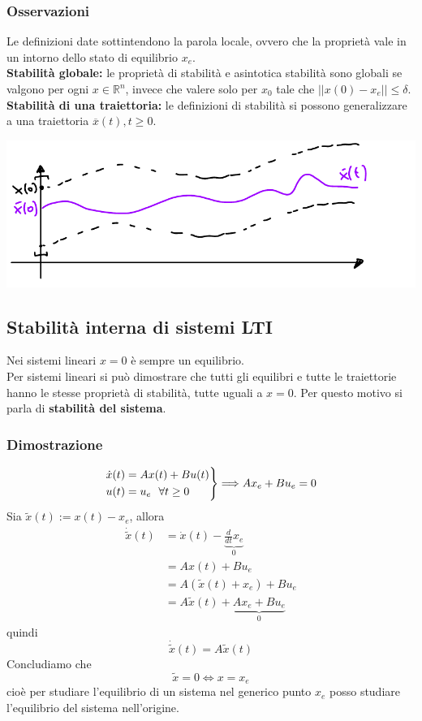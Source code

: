 \documentclass{article}
\begin{document}
\subsubsection{Osservazioni}
Le definizioni date sottintendono la parola locale, ovvero che la proprietà vale in un intorno dello stato di equilibrio $x_e$.
\vspace*{0.2cm}\\
\textbf{Stabilità globale:} le proprietà di stabilità e asintotica stabilità sono globali se valgono per ogni $x \in \mathbb{R}^n$, invece che valere solo per $x_0$ tale che $|| x(0)-x_e || \leq \delta $.
\vspace*{0.2cm}\\
\textbf{Stabilità di una traiettoria:} le definizioni di stabilità si possono generalizzare a una traiettoria $\overline{x}(t), t \geq 0$.
\begin{center}
    \includegraphics[scale=0.3]{Images/Stabilita_traiettoria.png}
\end{center}

\subsection{Stabilità interna di sistemi LTI}
Nei sistemi lineari $x=0$ è sempre un equilibrio.\\
Per sistemi lineari si può dimostrare che tutti gli equilibri e tutte le traiettorie hanno le stesse proprietà di stabilità, tutte uguali a $x=0$. Per questo motivo si parla di \textbf{stabilità del sistema}.
\subsubsection*{Dimostrazione}
\[
    \begin{rcases}
        \dot x(t) = Ax(t) + Bu(t)\\
        u(t) = u_e \ \ \forall t \geq 0
    \end{rcases}
    \Longrightarrow Ax_e + Bu_e = 0
\]
Sia $\tilde{x}(t) := x(t) - x_e$, allora
\begin{align*}
    \dot{\tilde{x}}(t) &= \dot x(t) - \underbrace{\frac{d}{dt}x_e}_{0}\\
    &=Ax(t)+Bu_e\\
    &=A(\tilde{x}(t)+x_e)+Bu_e\\
    &=A \tilde{x}(t) + \underbrace{Ax_e+Bu_e}_{0}
\end{align*}
quindi
\[
    \dot{\tilde{x}}(t) = A \tilde{x}(t)
\]
Concludiamo che
\[
    \tilde{x}=0 \Longleftrightarrow x = x_e
\]
cioè per studiare l'equilibrio di un sistema nel generico punto $x_e$ posso studiare l'equilibrio del sistema nell'origine.
\end{document}
